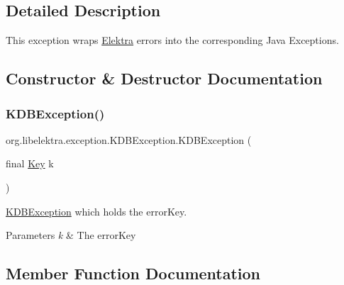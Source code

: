 \subsection{Detailed Description}
This exception wraps \mbox{\hyperlink{interfaceorg_1_1libelektra_1_1Elektra}{Elektra}} errors into the corresponding Java Exceptions. 

\subsection{Constructor \& Destructor Documentation}
\mbox{\label{classorg_1_1libelektra_1_1exception_1_1KDBException_a872741690ba68b12b14edc32e4675eef}} 
\subsubsection{\texorpdfstring{KDBException()}{KDBException()}}
{\footnotesize\ttfamily org.\+libelektra.\+exception.\+K\+D\+B\+Exception.\+K\+D\+B\+Exception (\begin{DoxyParamCaption}\item[{final \mbox{\hyperlink{classorg_1_1libelektra_1_1Key}{Key}}}]{k }\end{DoxyParamCaption})\hspace{0.3cm}{\ttfamily [inline]}}



\mbox{\hyperlink{classorg_1_1libelektra_1_1exception_1_1KDBException}{K\+D\+B\+Exception}} which holds the error\+Key. 


\begin{DoxyParams}{Parameters}
{\em k} & The error\+Key \\
\hline
\end{DoxyParams}


\subsection{Member Function Documentation}
\mbox{\label{classorg_1_1libelektra_1_1exception_1_1KDBException_ad963bf071d65028200f13f18bc355472}} 
